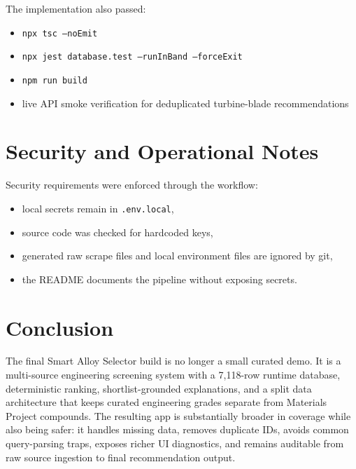 \documentclass[11pt,a4paper]{article}
\begin{document}
The implementation also passed:

\begin{itemize}[leftmargin=*]
  \item \texttt{npx tsc --noEmit}
  \item \texttt{npx jest database.test --runInBand --forceExit}
  \item \texttt{npm run build}
  \item live API smoke verification for deduplicated turbine-blade recommendations
\end{itemize}

\section{Security and Operational Notes}

Security requirements were enforced through the workflow:

\begin{itemize}[leftmargin=*]
  \item local secrets remain in \texttt{.env.local},
  \item source code was checked for hardcoded keys,
  \item generated raw scrape files and local environment files are ignored by git,
  \item the README documents the pipeline without exposing secrets.
\end{itemize}

\section{Conclusion}

The final Smart Alloy Selector build is no longer a small curated demo. It is a multi-source engineering screening system with a 7,118-row runtime database, deterministic ranking, shortlist-grounded explanations, and a split data architecture that keeps curated engineering grades separate from Materials Project compounds. The resulting app is substantially broader in coverage while also being safer: it handles missing data, removes duplicate IDs, avoids common query-parsing traps, exposes richer UI diagnostics, and remains auditable from raw source ingestion to final recommendation output.
\end{document}
